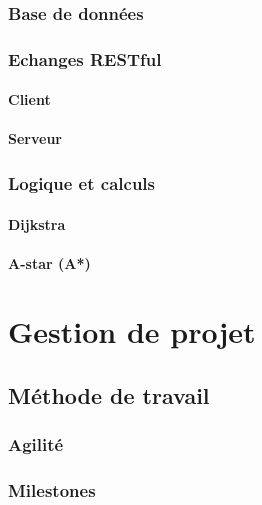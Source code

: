 \documentclass{article}
\begin{document}
\subsubsection{Base de données}

\subsubsection{Echanges RESTful}

\paragraph{Client}

\paragraph{Serveur}

\subsubsection{Logique et calculs}

\paragraph{Dijkstra}

\paragraph{A-star (A*)}

\newpage


\section{Gestion de projet}

\subsection{Méthode de travail}

\subsubsection{Agilité}

\subsubsection{Milestones}
\end{document}
